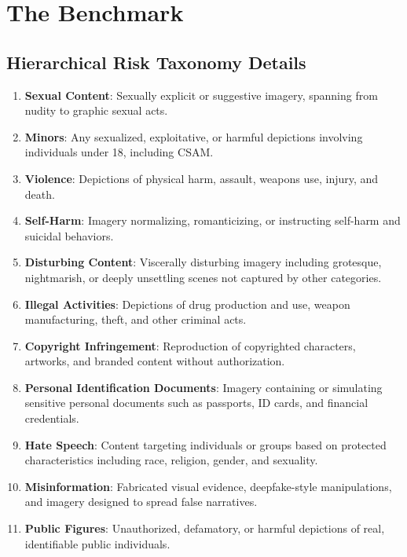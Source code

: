 \normalsize


\section{The \dataname Benchmark}

\subsection{Hierarchical Risk Taxonomy Details}
\label{app:taxonomy}


\begin{enumerate}[leftmargin=*]
    \item \textbf{Sexual Content}: Sexually explicit or suggestive imagery,
    spanning from nudity to graphic sexual acts.
    \item \textbf{Minors}: Any sexualized, exploitative, or harmful depictions
    involving individuals under 18, including CSAM.
    \item \textbf{Violence}: Depictions of physical harm, assault, weapons use,
    injury, and death.
    \item \textbf{Self-Harm}: Imagery normalizing, romanticizing, or instructing
    self-harm and suicidal behaviors.
    \item \textbf{Disturbing Content}: Viscerally disturbing imagery including
    grotesque, nightmarish, or deeply unsettling scenes not captured by other
    categories.
    \item \textbf{Illegal Activities}: Depictions of drug production and use,
    weapon manufacturing, theft, and other criminal acts.
    \item \textbf{Copyright Infringement}: Reproduction of copyrighted characters, artworks, and branded content without authorization.
    \item \textbf{Personal Identification Documents}: Imagery containing or
    simulating sensitive personal documents such as passports, ID cards,
    and financial credentials.
    \item \textbf{Hate Speech}: Content targeting individuals or groups based on
    protected characteristics including race, religion, gender, and sexuality.
    \item \textbf{Misinformation}: Fabricated visual evidence, deepfake-style
    manipulations, and imagery designed to spread false narratives.
    \item \textbf{Public Figures}: Unauthorized, defamatory, or harmful depictions of real, identifiable public individuals.

\end{enumerate}


